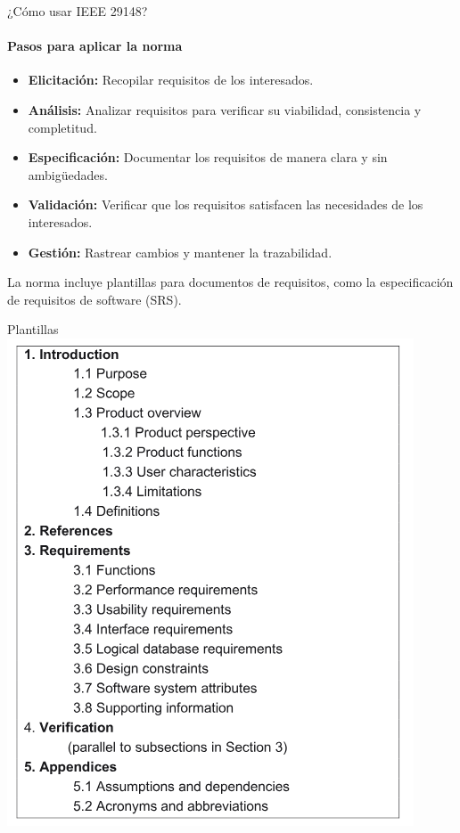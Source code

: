 \documentclass[
  24pt, %
  aspectratio=169, %
]{beamer}
\begin{document}

\begin{frame}{¿Cómo usar IEEE 29148?}
\framesubtitle{Pasos para aplicar la norma}
\begin{itemize}
    \item \textbf{Elicitación:} Recopilar requisitos de los interesados.
    \item \textbf{Análisis:} Analizar requisitos para verificar su viabilidad, consistencia y completitud.
    \item \textbf{Especificación:} Documentar los requisitos de manera clara y sin ambigüedades.
    \item \textbf{Validación:} Verificar que los requisitos satisfacen las necesidades de los interesados.
    \item \textbf{Gestión:} Rastrear cambios y mantener la trazabilidad.
\end{itemize}
\bigskip %
La norma incluye plantillas para documentos de requisitos, como la especificación de requisitos de software (SRS).
\end{frame}

\begin{frame}{Plantillas}
  \centering
  \includegraphics[width=0.4\linewidth]{plantilla.png}
\end{frame}
\end{document}
